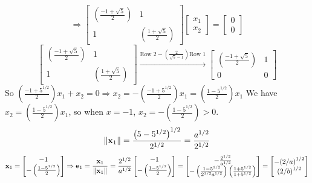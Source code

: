         \[
            \Rightarrow
            \begin{bmatrix}
                \left(\frac{-1 + \sqrt{5}}{2}\right) & 1 \\
                1 & \left(\frac{1 + \sqrt{5}}{2}\right)
            \end{bmatrix}
            \begin{bmatrix}
                x_1 \\
                x_2
            \end{bmatrix}
            =
            \begin{bmatrix}
                0 \\
                0
            \end{bmatrix}
        \]
        \[
            \begin{bmatrix}
                \left(\frac{-1 + \sqrt{5}}{2}\right) & 1 \\
                1 & \left(\frac{1 + \sqrt{5}}{2}\right)
            \end{bmatrix}
            \overset{\text{Row 2} - \left(\frac{2}{\sqrt{5} - 1}\right)\text{Row 1}}{\longrightarrow}
            \begin{bmatrix}
                \left(\frac{-1 + \sqrt{5}}{2}\right) & 1 \\
                0 & 0
            \end{bmatrix}
        \]
        So $\left(\frac{-1 + 5^{1/2}}{2}\right)x_1 + x_2 = 0 \Rightarrow x_2 
        = -\left(\frac{-1 + 5^{1/2}}{2}\right)x_1 = \left(\frac{1 - 5^{1/2}}{2}\right)x_1$
        \newline
        We have $x_2 = \left(\frac{1 - 5^{1/2}}{2}\right)x_1$, so when $x = -1$, $x_2 = -\left(\frac{1 - 5^{1/2}}{2}\right) > 0$.
        \[
            {\left\|\bold{x}_1\right\|} = \frac{{\left(5 - 5^{1/2}\right)^{1/2}}}{2^{1/2}} = \frac{a^{1/2}}{2^{1/2}}
        \]
        \[
            \bold{x}_1
            =
            \begin{bmatrix}
                -1 \\
                -\left(\frac{1 - 5^{1/2}}{2}\right)
            \end{bmatrix}
            \Rightarrow
            \bold{e}_1
            =
            \frac{\bold{x}_1}{\left\|\bold{x}_1\right\|}
            =
            \frac{2^{1/2}}{a^{1/2}}
            \begin{bmatrix}
                -1 \\
                -\left(\frac{1 - 5^{1/2}}{2}\right)
            \end{bmatrix}
            =
            \begin{bmatrix}
                -\frac{2^{1/2}}{a^{1/2}} \\
                -\left(\frac{1 - 5^{1/2}}{2^{1/2}a^{1/2}}\right)\left(\frac{1 + 5^{1/2}}{1 + 5^{1/2}}\right)
            \end{bmatrix}
            =
            \begin{bmatrix}
                -{\left(2/a\right)}^{1/2} \\
                {\left(2/b\right)}^{1/2}
            \end{bmatrix}
        \]
